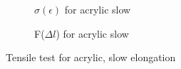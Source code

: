 \documentclass{scrartcl}
\begin{document}
\begin{figure}[!ht]
    \centering
    \begin{subfigure}{0.49\textwidth}
        \caption{$\sigma(\epsilon)$ for acrylic slow}
        \label{fig:tensileAcrylicSlowSigma}
    \end{subfigure}
    \begin{subfigure}{0.49\textwidth}
        \caption{F($\Delta l$) for acrylic slow}
        \label{fig:tensileAcrylicSlowForce}
    \end{subfigure}
    \caption{Tensile test for acrylic, slow elongation}
    \label{fig:tensileAcrylicSlow}
\end{figure}
\end{document}
